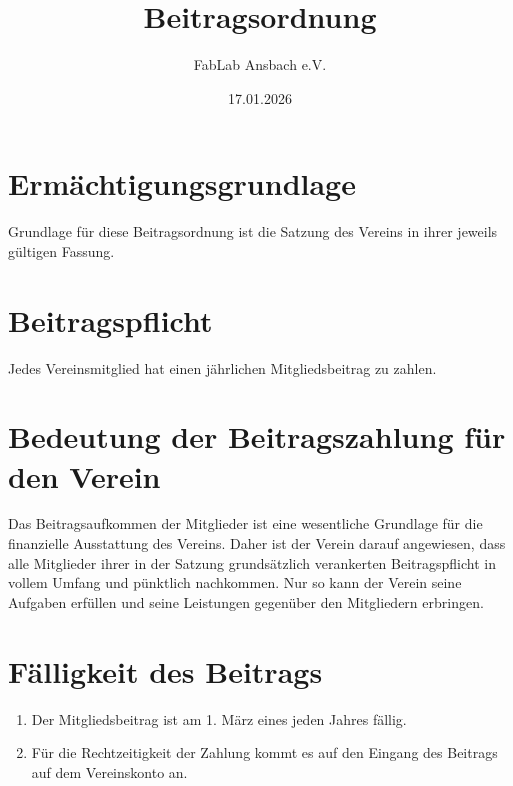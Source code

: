 \title{Beitragsordnung}
\author{FabLab Ansbach e.V.}
\date{17.01.2026}


\usepackage{enumitem}

\usepackage{array}
\usepackage{tabularx}
\usepackage{makecell}


\makeatletter
\def\@seccntformat#1{\@ifundefined{#1@cntformat}%
   {\csname the#1\endcsname\quad}%
   {\csname #1@cntformat\endcsname}}%
\newcommand\section@cntformat{\S\thesection\quad}   %
\makeatother



\maketitle

\section{Ermächtigungsgrundlage}
Grundlage für diese Beitragsordnung ist die Satzung des Vereins in ihrer jeweils gültigen Fassung.

\section{Beitragspflicht}
Jedes Vereinsmitglied hat einen jährlichen Mitgliedsbeitrag zu zahlen.

\section{Bedeutung der Beitragszahlung für den Verein}
Das Beitragsaufkommen der Mitglieder ist eine wesentliche Grundlage für die finanzielle Ausstattung des Vereins. Daher ist der Verein darauf angewiesen, dass alle Mitglieder ihrer in der Satzung grundsätzlich verankerten Beitragspflicht in vollem Umfang und pünktlich nachkommen. Nur so kann der Verein seine Aufgaben erfüllen und seine Leistungen gegenüber den Mitgliedern erbringen.

\section{Fälligkeit des Beitrags}
\begin{enumerate}
  \item Der Mitgliedsbeitrag ist am 1. März eines jeden Jahres fällig.
  \item Für die Rechtzeitigkeit der Zahlung kommt es auf den Eingang des Beitrags auf dem Vereinskonto an.
\end{enumerate}

